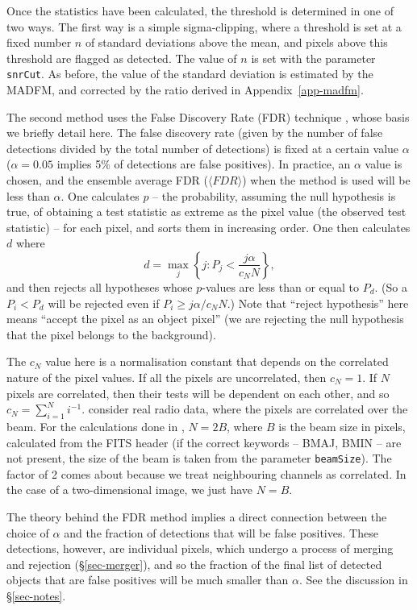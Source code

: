 
Once the statistics have been calculated, the threshold is determined
in one of two ways. The first way is a simple sigma-clipping, where a
threshold is set at a fixed number $n$ of standard deviations above
the mean, and pixels above this threshold are flagged as detected. The
value of $n$ is set with the parameter \texttt{snrCut}. As before, the
value of the standard deviation is estimated by the MADFM, and
corrected by the ratio derived in Appendix~\ref{app-madfm}.

The second method uses the False Discovery Rate (FDR) technique
\citep{miller01,hopkins02}, whose basis we briefly detail here. The
false discovery rate (given by the number of false detections divided
by the total number of detections) is fixed at a certain value
$\alpha$ (\eg $\alpha=0.05$ implies 5\% of detections are false
positives). In practice, an $\alpha$ value is chosen, and the ensemble
average FDR (\ie $\langle FDR \rangle$) when the method is used will
be less than $\alpha$.  One calculates $p$ -- the probability,
assuming the null hypothesis is true, of obtaining a test statistic as
extreme as the pixel value (the observed test statistic) -- for each
pixel, and sorts them in increasing order. One then calculates $d$
where
\[
d = \max_j \left\{ j : P_j < \frac{j\alpha}{c_N N} \right\},
\]
and then rejects all hypotheses whose $p$-values are less than or
equal to $P_d$. (So a $P_i<P_d$ will be rejected even if $P_i \geq
j\alpha/c_N N$.) Note that ``reject hypothesis'' here means ``accept
the pixel as an object pixel'' (\ie we are rejecting the null
hypothesis that the pixel belongs to the background).

The $c_N$ value here is a normalisation constant that depends on the
correlated nature of the pixel values. If all the pixels are
uncorrelated, then $c_N=1$. If $N$ pixels are correlated, then their
tests will be dependent on each other, and so $c_N = \sum_{i=1}^N
i^{-1}$. \citet{hopkins02} consider real radio data, where the pixels
are correlated over the beam. For the calculations done in \duchamp,
$N=2B$, where $B$ is the beam size in pixels, calculated from the FITS
header (if the correct keywords -- BMAJ, BMIN -- are not present, the
size of the beam is taken from the parameter \texttt{beamSize}). The
factor of 2 comes about because we treat neighbouring channels as
correlated. In the case of a two-dimensional image, we just have
$N=B$. 

The theory behind the FDR method implies a direct connection between
the choice of $\alpha$ and the fraction of detections that will be
false positives. These detections, however, are individual pixels,
which undergo a process of merging and rejection (\S\ref{sec-merger}),
and so the fraction of the final list of detected objects that are
false positives will be much smaller than $\alpha$. See the discussion
in \S\ref{sec-notes}.


